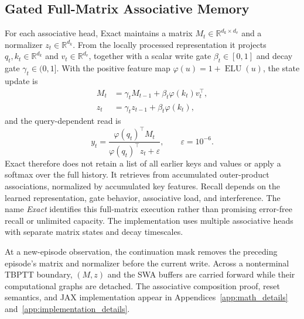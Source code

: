 \subsection{Gated Full-Matrix Associative Memory}
For each associative head, Exact maintains a matrix
$M_t\in\mathbb{R}^{d_k\times d_v}$ and a normalizer
$z_t\in\mathbb{R}^{d_k}$. From the locally processed representation it projects
$q_t,k_t\in\mathbb{R}^{d_k}$ and $v_t\in\mathbb{R}^{d_v}$, together with a scalar
write gate $\beta_t\in[0,1]$ and decay gate $\gamma_t\in(0,1]$. With the positive
feature map $\varphi(u)=1+\operatorname{ELU}(u)$, the state update is
\begin{align}
M_t &= \gamma_t M_{t-1}+\beta_t\varphi(k_t)v_t^\top,
\label{eq:matrix_recurrence}\\
z_t &= \gamma_t z_{t-1}+\beta_t\varphi(k_t),
\end{align}
and the query-dependent read is
\begin{equation}
y_t=\frac{\varphi(q_t)^\top M_t}
{\varphi(q_t)^\top z_t+\varepsilon},\qquad \varepsilon=10^{-6}.
\label{eq:query_retrieval}
\end{equation}
Exact therefore does not retain a list of all earlier keys and values or apply a
softmax over the full history. It retrieves from accumulated outer-product
associations, normalized by accumulated key features. Recall depends on the
learned representation, gate behavior, associative load, and interference. The
name \emph{Exact} identifies this full-matrix execution rather than promising
error-free recall or unlimited capacity. The implementation uses multiple
associative heads with separate matrix states and decay timescales.

At a new-episode observation, the continuation mask removes the preceding
episode's matrix and normalizer before the current write. Across a nonterminal
TBPTT boundary, $(M,z)$ and the SWA buffers are carried forward while their
computational graphs are detached. The associative composition proof, reset
semantics, and JAX implementation appear in Appendices~\ref{app:math_details}
and~\ref{app:implementation_details}.

